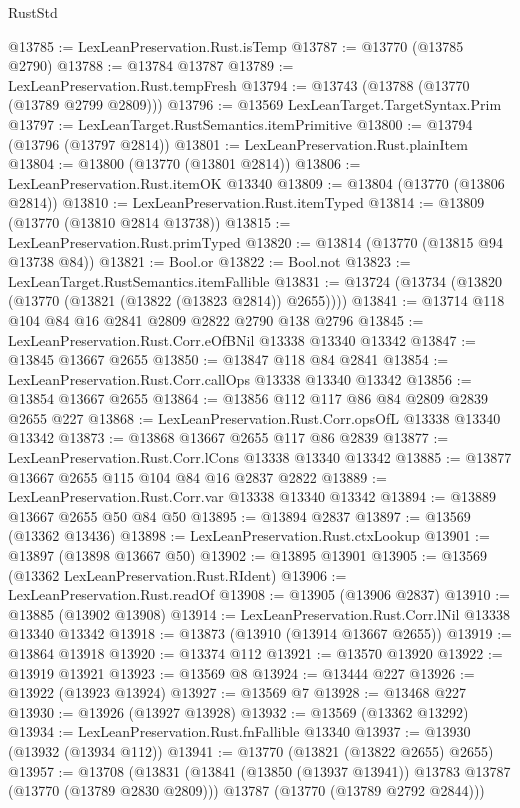 \begin{lexlean}{RustStd}
\begin{coremodule}
@13785 := LexLeanPreservation.Rust.isTemp
@13787 := @13770 (@13785 @2790)
@13788 := @13784 @13787
@13789 := LexLeanPreservation.Rust.tempFresh
@13794 := @13743 (@13788 (@13770 (@13789 @2799 @2809)))
@13796 := @13569 LexLeanTarget.TargetSyntax.Prim
@13797 := LexLeanTarget.RustSemantics.itemPrimitive
@13800 := @13794 (@13796 (@13797 @2814))
@13801 := LexLeanPreservation.Rust.plainItem
@13804 := @13800 (@13770 (@13801 @2814))
@13806 := LexLeanPreservation.Rust.itemOK @13340
@13809 := @13804 (@13770 (@13806 @2814))
@13810 := LexLeanPreservation.Rust.itemTyped
@13814 := @13809 (@13770 (@13810 @2814 @13738))
@13815 := LexLeanPreservation.Rust.primTyped
@13820 := @13814 (@13770 (@13815 @94 @13738 @84))
@13821 := Bool.or
@13822 := Bool.not
@13823 := LexLeanTarget.RustSemantics.itemFallible
@13831 := @13724 (@13734 (@13820 (@13770 (@13821 (@13822 (@13823 @2814)) @2655))))
@13841 := @13714 @118 @104 @84 @16 @2841 @2809 @2822 @2790 @138 @2796
@13845 := LexLeanPreservation.Rust.Corr.eOfBNil @13338 @13340 @13342
@13847 := @13845 @13667 @2655
@13850 := @13847 @118 @84 @2841
@13854 := LexLeanPreservation.Rust.Corr.callOps @13338 @13340 @13342
@13856 := @13854 @13667 @2655
@13864 := @13856 @112 @117 @86 @84 @2809 @2839 @2655 @227
@13868 := LexLeanPreservation.Rust.Corr.opsOfL @13338 @13340 @13342
@13873 := @13868 @13667 @2655 @117 @86 @2839
@13877 := LexLeanPreservation.Rust.Corr.lCons @13338 @13340 @13342
@13885 := @13877 @13667 @2655 @115 @104 @84 @16 @2837 @2822
@13889 := LexLeanPreservation.Rust.Corr.var @13338 @13340 @13342
@13894 := @13889 @13667 @2655 @50 @84 @50
@13895 := @13894 @2837
@13897 := @13569 (@13362 @13436)
@13898 := LexLeanPreservation.Rust.ctxLookup
@13901 := @13897 (@13898 @13667 @50)
@13902 := @13895 @13901
@13905 := @13569 (@13362 LexLeanPreservation.Rust.RIdent)
@13906 := LexLeanPreservation.Rust.readOf
@13908 := @13905 (@13906 @2837)
@13910 := @13885 (@13902 @13908)
@13914 := LexLeanPreservation.Rust.Corr.lNil @13338 @13340 @13342
@13918 := @13873 (@13910 (@13914 @13667 @2655))
@13919 := @13864 @13918
@13920 := @13374 @112
@13921 := @13570 @13920
@13922 := @13919 @13921
@13923 := @13569 @8
@13924 := @13444 @227
@13926 := @13922 (@13923 @13924)
@13927 := @13569 @7
@13928 := @13468 @227
@13930 := @13926 (@13927 @13928)
@13932 := @13569 (@13362 @13292)
@13934 := LexLeanPreservation.Rust.fnFallible @13340
@13937 := @13930 (@13932 (@13934 @112))
@13941 := @13770 (@13821 (@13822 @2655) @2655)
@13957 := @13708
    (@13831
      (@13841 (@13850 (@13937 @13941)) @13783 @13787 (@13770 (@13789 @2830 @2809)))
      @13787
      (@13770 (@13789 @2792 @2844)))

\end{coremodule}
\end{lexlean}
